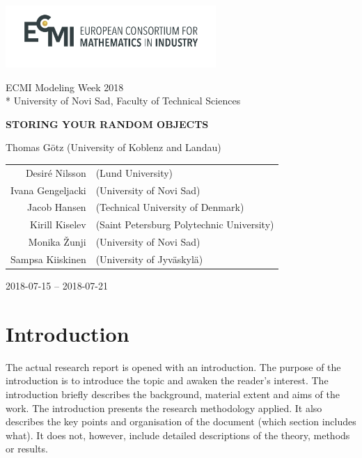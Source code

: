 \documentclass[12pt, sumlimits, intlimits]{article}
\begin{document}
\includegraphics[width=8cm]{ecmi-logo}

ECMI Modeling Week 2018 \\*
University of Novi Sad, Faculty of Technical Sciences

\begin{center}
\vspace{2.0cm}
{\Large{\textbf{\MakeUppercase{Storing your random objects}}}}


Thomas Götz (University of Koblenz and Landau)


\begin{tabular}{rl}
Desiré Nilsson & (Lund University) \\
Ivana Gengeljacki & (University of Novi Sad) \\
Jacob Hansen & (Technical University of Denmark) \\
Kirill Kiselev & (Saint Petersburg Polytechnic University) \\
Monika Žunji & (University of Novi Sad) \\
Sampsa Kiiskinen & (University of Jyväskylä)
\end{tabular}


2018-07-15 -- 2018-07-21

\end{center}


\clearpage

\tableofcontents

\clearpage

\section{Introduction}

The actual research report is opened with an introduction. The purpose of the
introduction is to introduce the topic and awaken the reader's interest. The
introduction briefly describes the background, material extent and aims of the
work. The introduction presents the research methodology applied. It also
describes the key points and organisation of the document (which section
includes what). It does not, however, include detailed descriptions of the
theory, methods or results.
\end{document}
